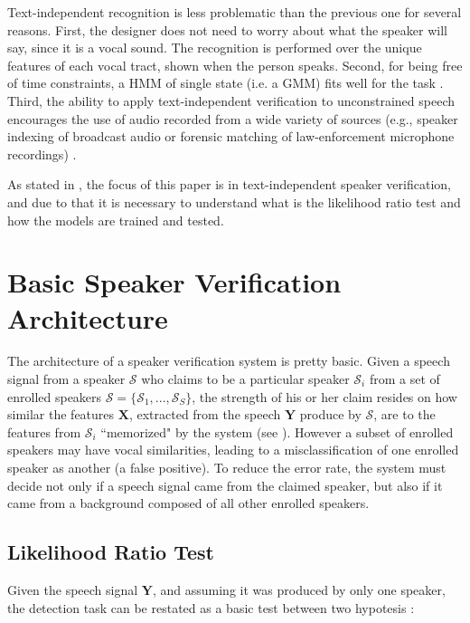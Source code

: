 Text-independent recognition is less problematic than the previous one for several reasons. First, the designer does not need to worry about what the speaker will say, since it is a vocal sound. The recognition is performed over the unique features of each vocal tract, shown when the person speaks. Second, for being free of time constraints, a HMM of single state (i.e. a GMM) fits well for the task \cite{hebert.2008}. Third, the ability to apply text-independent verification to unconstrained speech encourages the use of audio recorded from a wide variety of sources (e.g., speaker indexing of broadcast audio or forensic matching of law-enforcement microphone recordings) \cite{reynolds.campbell.2008}.

As stated in , the focus of this paper is in text-independent speaker verification, and due to that it is necessary to understand what is the likelihood ratio test and how the models are trained and tested.

\section{Basic Speaker Verification Architecture}

The architecture of a speaker verification system is pretty basic. Given a speech signal from a speaker $\mathcal{S}$ who claims to be a particular speaker $\mathcal{S}_i$ from a set of enrolled speakers $\boldsymbol{\mathcal{S}} = \{\mathcal{S}_1, ..., \mathcal{S}_S\}$, the strength of his or her claim resides on how similar the features $\boldsymbol{X}$, extracted from the speech $\boldsymbol{Y}$ produce by $\mathcal{S}$, are to the features from $\mathcal{S}_i$ ``memorized" by the system (see ). However a subset of enrolled speakers may have vocal similarities, leading to a misclassification of one enrolled speaker as another (a false positive). To reduce the error rate, the system must decide not only if a speech signal came from the claimed speaker, but also if it came from a background composed of all other enrolled speakers.

\subsection{Likelihood Ratio Test}

Given the speech signal $\boldsymbol{Y}$, and assuming it was produced by only one speaker, the detection task can be restated as a basic test between two hypotesis \cite{reynolds.1995b}:

